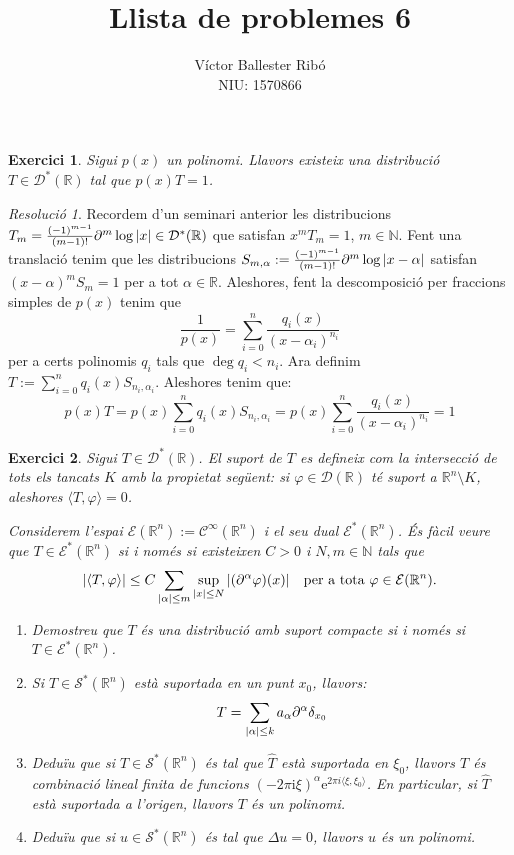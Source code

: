 \documentclass[10pt,a4paper]{article}
\title{\bfseries\Large Llista de problemes 6}
\author{Víctor Ballester Ribó\\NIU: 1570866}
\date{\parbox{\linewidth}{\centering
  Anàlisi Harmònica\endgraf
  Grau en Matemàtiques\endgraf
  Universitat Autònoma de Barcelona\endgraf
  Maig de 2023}}
\newcommand{\NN}{\ensuremath{\mathbb{N}}} %
\newcommand{\RR}{\ensuremath{\mathbb{R}}} %
\newcommand{\ii}{\mathrm{i}} %
\newtheorem{exercici}{Exercici}
\theoremstyle{definition}
\theoremstyle{remark}
\newtheorem*{res}{Resolució}
\renewcommand{\exp}[1]{\mathrm{e}^{#1}} %
\begin{document}
\maketitle
\setcounter{exercici}{1}
\begin{exercici}
  Sigui $p(x)$ un polinomi. Llavors existeix una distribució $T\in\mathcal{D}^*(\RR)$ tal que $p(x)T=1$.
\end{exercici}
\begin{res}
  Recordem d'un seminari anterior les distribucions $T_m=\frac{{(-1)}^{m-1}}{(m-1)!}\partial^m\log\abs{x}\in \mathcal{D}^*(\RR)$ que satisfan $x^mT_m=1$, $m\in\NN$. Fent una translació tenim que les distribucions $S_{m,\alpha}:=\frac{{(-1)}^{m-1}}{(m-1)!}\partial^m\log\abs{x-\alpha}$ satisfan ${(x-\alpha)}^mS_m=1$ per a tot $\alpha\in\RR$.
  Aleshores, fent la descomposició per fraccions simples de $p(x)$ tenim que
  $$
    \frac{1}{p(x)} = \sum_{i=0}^n \frac{q_i(x)}{{(x-\alpha_i)}^{n_i}}
  $$
  per a certs polinomis $q_i$ tals que $\deg q_i<n_i$. Ara definim $T:= \sum_{i=0}^n q_i(x)S_{n_i,\alpha_i}$. Aleshores tenim que:
  $$
    p(x)T=p(x)\sum_{i=0}^n q_i(x)S_{n_i,\alpha_i} =p(x) \sum_{i=0}^n \frac{q_i(x)}{{(x-\alpha_i)}^{n_i}} =1
  $$
\end{res}
\begin{exercici}
  Sigui $T\in \mathcal{D}^*(\RR)$. El \emph{suport} de $T$ es defineix com la intersecció de tots els tancats $K$ amb la propietat següent: si $\varphi\in\mathcal{D}(\RR)$ té suport a $\RR^n \setminus K$, aleshores $\langle T,\varphi\rangle=0$.

  Considerem l'espai $\mathcal{E}(\RR^n):=\mathcal{C}^\infty(\RR^n)$ i el seu dual $\mathcal{E}^*(\RR^n)$. És fàcil veure que $T\in \mathcal{E}^*(\RR^n)$ si i només si existeixen $C>0$ i $N, m\in\NN$ tals que
  $$
    \abs{\langle T,\varphi\rangle}\leq C\sum_{\abs{\alpha}\leq m}\sup_{\abs{x}\leq N}\abs{(\partial^\alpha\varphi)(x)}\quad\text{per a tota }\varphi\in\mathcal{E}(\RR^n).
  $$
  \begin{enumerate}
    \item Demostreu que $T$ és una distribució amb suport compacte si i només si $T\in \mathcal{E}^*(\RR^n)$.
    \item Si $T\in \mathcal{S}^*(\RR^n)$ està suportada en un punt $x_0$, llavors:
          $$
            T=\sum_{\abs{\alpha}\leq k}a_\alpha\partial^\alpha\delta_{x_0}
          $$
    \item Deduïu que si $T\in \mathcal{S}^*(\RR^n)$ és tal que $\widehat{T}$ està suportada en $\xi_0$, llavors $T$ és combinació lineal finita de funcions ${(-2\pi\ii\xi)}^\alpha\exp{2\pi i\langle \xi,\xi_0\rangle}$. En particular, si $\widehat{T}$ està suportada a l'origen, llavors $T$ és un polinomi.
    \item Deduïu que si $u\in \mathcal{S}^*(\RR^n)$ és tal que $\Delta u=0$, llavors $u$ és un polinomi.
  \end{enumerate}
\end{exercici}
\end{document}
